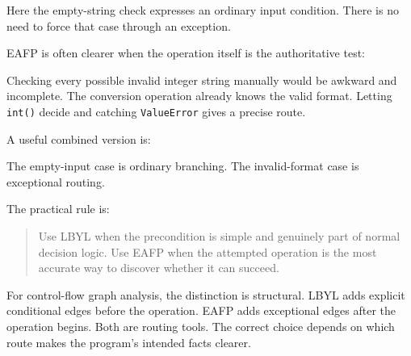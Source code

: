 Here the empty-string check expresses an ordinary input condition. There is no need to force that case through an exception.

EAFP is often clearer when the operation itself is the authoritative test:

Checking every possible invalid integer string manually would be awkward and incomplete. The conversion operation already knows the valid format. Letting \texttt{int()} decide and catching \texttt{ValueError} gives a precise route.

A useful combined version is:

The empty-input case is ordinary branching. The invalid-format case is exceptional routing.

The practical rule is:

\begin{quote}
Use LBYL when the precondition is simple and genuinely part of normal decision logic. Use EAFP when the attempted operation is the most accurate way to discover whether it can succeed.
\end{quote}

For control-flow graph analysis, the distinction is structural. LBYL adds explicit conditional edges before the operation. EAFP adds exceptional edges after the operation begins. Both are routing tools. The correct choice depends on which route makes the program's intended facts clearer.